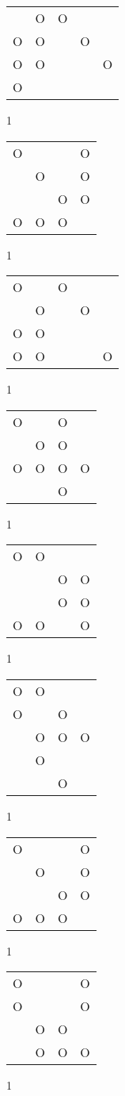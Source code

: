 \begin{tabular}{|m{0.2cm}m{0.2cm}m{0.2cm}m{0.2cm}m{0.2cm}|}\hline
 &O&O& & \\
O&O& &O& \\
O&O& & &O\\
O& & & & \\
\hline\end{tabular}1
\begin{tabular}{|m{0.2cm}m{0.2cm}m{0.2cm}m{0.2cm}|}\hline
O& & &O\\
 &O& &O\\
 & &O&O\\
O&O&O& \\
\hline\end{tabular}1
\begin{tabular}{|m{0.2cm}m{0.2cm}m{0.2cm}m{0.2cm}m{0.2cm}|}\hline
O& &O& & \\
 &O& &O& \\
O&O& & & \\
O&O& & &O\\
\hline\end{tabular}1
\begin{tabular}{|m{0.2cm}m{0.2cm}m{0.2cm}m{0.2cm}|}\hline
O& &O& \\
 &O&O& \\
O&O&O&O\\
 & &O& \\
\hline\end{tabular}1
\begin{tabular}{|m{0.2cm}m{0.2cm}m{0.2cm}m{0.2cm}|}\hline
O&O& & \\
 & &O&O\\
 & &O&O\\
O&O& &O\\
\hline\end{tabular}1
\begin{tabular}{|m{0.2cm}m{0.2cm}m{0.2cm}m{0.2cm}|}\hline
O&O& & \\
O& &O& \\
 &O&O&O\\
 &O& & \\
 & &O& \\
\hline\end{tabular}1
\begin{tabular}{|m{0.2cm}m{0.2cm}m{0.2cm}m{0.2cm}|}\hline
O& & &O\\
 &O& &O\\
 & &O&O\\
O&O&O& \\
\hline\end{tabular}1
\begin{tabular}{|m{0.2cm}m{0.2cm}m{0.2cm}m{0.2cm}|}\hline
O& & &O\\
O& & &O\\
 &O&O& \\
 &O&O&O\\
\hline\end{tabular}1

